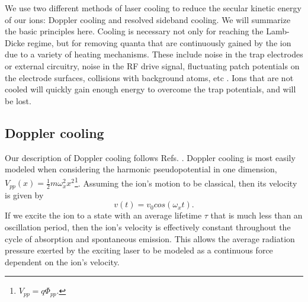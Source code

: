 We use two different methods of laser cooling to reduce the secular kinetic energy of our ions: Doppler cooling and resolved sideband cooling. We will summarize the basic principles here. Cooling is necessary not only for reaching the Lamb-Dicke regime, but for removing quanta that are continuously gained by the ion due to a variety of heating mechanisms. These include noise in the trap electrodes or external circuitry, noise in the RF drive signal, fluctuating patch potentials on the electrode surfaces, collisions with background atoms, etc \cite{Turchette.PRA.61.063418}. Ions that are not cooled will quickly gain enough energy to overcome the trap potentials, and will be lost.

\subsection{Doppler cooling}
Our description of Doppler cooling follows  Refs. \cite{Doppler, Leibfried03.RMP.75.281}. Doppler cooling is most easily modeled when considering the harmonic pseudopotential in one dimension, $V_{pp}(x) = \frac{1}{2} m \omega_x^2 x^2$\footnote{$V_{pp} = q \Phi_{pp}$.}. Assuming the ion's motion to be classical, then its velocity is given by
\begin{equation}
v(t) = v_0 cos(\omega_x t) \text{.}
\end{equation}
If we excite the ion to a state with an average lifetime $\tau$ that is much less than an oscillation period, then the ion's velocity is effectively constant throughout the cycle of absorption and spontaneous emission. This allows the average radiation pressure exerted by the exciting laser to be modeled as a continuous force dependent on the ion's velocity. 


